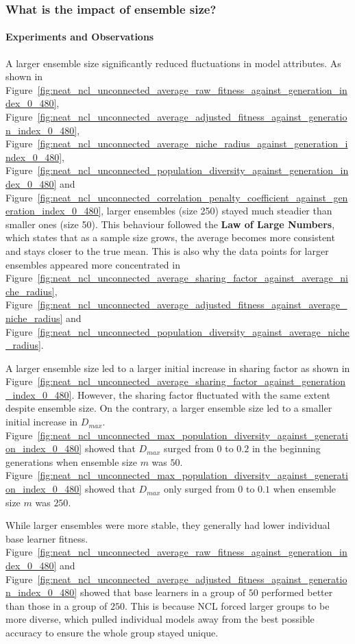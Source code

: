 \documentclass{article}
\begin{document}
\subsubsection{What is the impact of ensemble size? }
\paragraph{Experiments and Observations}
A larger ensemble size significantly reduced fluctuations in model attributes. As shown in Figure~\ref{fig:neat_ncl_unconnected_average_raw_fitness_against_generation_index_0_480}, Figure~\ref{fig:neat_ncl_unconnected_average_adjusted_fitness_against_generation_index_0_480}, Figure~\ref{fig:neat_ncl_unconnected_average_niche_radius_against_generation_index_0_480}, Figure~\ref{fig:neat_ncl_unconnected_population_diversity_against_generation_index_0_480} and Figure~\ref{fig:neat_ncl_unconnected_correlation_penalty_coefficient_against_generation_index_0_480}, larger ensembles (size 250) stayed much steadier than smaller ones (size 50). This behaviour followed the \textbf{Law of Large Numbers}, which states that as a sample size grows, the average becomes more consistent and stays closer to the true mean. This is also why the data points for larger ensembles appeared more concentrated in Figure~\ref{fig:neat_ncl_unconnected_average_sharing_factor_against_average_niche_radius}, Figure~\ref{fig:neat_ncl_unconnected_average_adjusted_fitness_against_average_niche_radius} and Figure~\ref{fig:neat_ncl_unconnected_population_diversity_against_average_niche_radius}. 

A larger ensemble size led to a larger initial increase in sharing factor as shown in Figure~\ref{fig:neat_ncl_unconnected_average_sharing_factor_against_generation_index_0_480}. However, the sharing factor fluctuated with the same extent despite ensemble size. On the contrary, a larger ensemble size led to a smaller initial increase in $D_{max}$. Figure~\ref{fig:neat_ncl_unconnected_max_population_diversity_against_generation_index_0_480} showed that $D_{max}$ surged from $0$ to $0.2$ in the beginning generations when ensemble size $m$ was $50$. Figure~\ref{fig:neat_ncl_unconnected_max_population_diversity_against_generation_index_0_480} showed that $D_{max}$ only surged from $0$ to $0.1$ when ensemble size $m$ was $250$. 

While larger ensembles were more stable, they generally had lower individual base learner fitness. Figure~\ref{fig:neat_ncl_unconnected_average_raw_fitness_against_generation_index_0_480} and Figure~\ref{fig:neat_ncl_unconnected_average_adjusted_fitness_against_generation_index_0_480} showed that base learners in a group of $50$ performed better than those in a group of $250$. This is because NCL forced larger groups to be more diverse, which pulled individual models away from the best possible accuracy to ensure the whole group stayed unique. 
\end{document}
